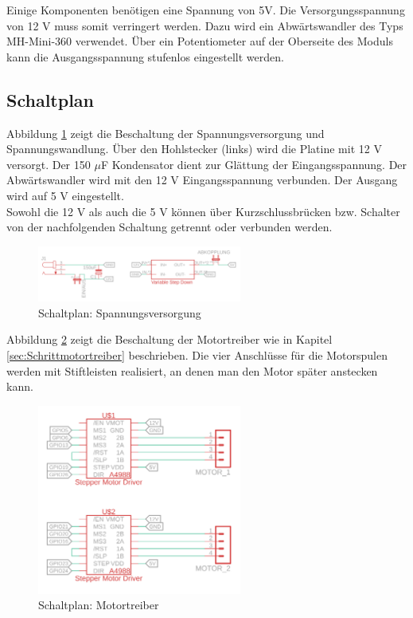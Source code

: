 Einige Komponenten benötigen eine Spannung von 5V. Die Versorgungsspannung von 12 V muss somit verringert werden. Dazu wird ein Abwärtswandler des Typs MH-Mini-360 verwendet. Über ein Potentiometer auf der Oberseite des Moduls kann die Ausgangsspannung stufenlos eingestellt werden.

\subsection{Schaltplan} \label{sec:Schaltplan} 
Abbildung \ref{spannung} zeigt die Beschaltung der Spannungsversorgung und Spannungswandlung. Über den Hohlstecker (links) wird die Platine mit 12 V versorgt. Der 150 $\mu$F Kondensator dient zur Glättung der Eingangsspannung. Der Abwärtswandler wird mit den 12 V Eingangsspannung verbunden. Der Ausgang wird auf 5 V eingestellt. \\
Sowohl die 12 V als auch die 5 V können über Kurzschlussbrücken bzw. Schalter von der nachfolgenden Schaltung getrennt oder verbunden werden.    

\begin{figure}[H]
	\centering
	\includegraphics[width=0.6\textwidth]{images/Hardware/Schaltplan/Spannung}
	\caption{Schaltplan: Spannungsversorgung}
	\label{spannung}
\end{figure}

Abbildung \ref{driver} zeigt die Beschaltung der Motortreiber wie in Kapitel \ref{sec:Schrittmotortreiber} beschrieben. Die vier Anschlüsse für die Motorspulen werden mit Stiftleisten realisiert, an denen man den Motor später anstecken kann.

\begin{figure}[H]
	\centering
	\includegraphics[width=0.6\textwidth]{images/Hardware/Schaltplan/Driver}
	\caption{Schaltplan: Motortreiber}
	\label{driver}
\end{figure}

